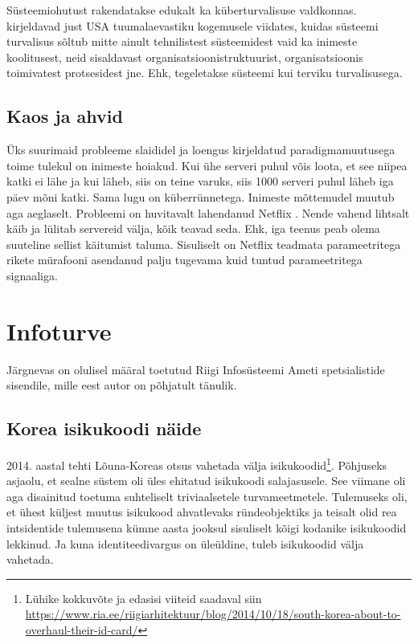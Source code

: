 \documentclass{article}
\begin{document}
Süsteemiohutust rakendatakse edukalt ka küberturvalisuse valdkonnas. \citeauthor{hbrcyber} kirjeldavad \citep{hbrcyber} just USA tuumalaevastiku kogemusele viidates, kuidas süsteemi turvalisus sõltub mitte ainult tehnilistest süsteemidest vaid ka inimeste koolitusest, neid sisaldavast organisatsioonistruktuurist, organisatsioonis toimivatest protsesidest jne. Ehk, tegeletakse süsteemi kui terviku turvalisusega.

\subsection{Kaos ja ahvid}
Üks suurimaid probleeme slaididel ja loengus kirjeldatud paradigmamuutusega toime tulekul on inimeste hoiakud. Kui ühe serveri puhul võis loota, et see niipea katki ei lähe ja kui läheb, siis on teine varuks, siis 1000 serveri puhul läheb iga päev mõni katki. Sama lugu on küberrünnetega. Inimeste mõttemudel muutub aga aeglaselt. Probleemi on huvitavalt lahendanud Netflix \citep{monkey}. Nende vahend lihtsalt käib ja lülitab servereid välja, kõik teavad seda. Ehk, iga teenus peab olema suuteline sellist käitumist taluma. Sisuliselt on Netflix teadmata parameetritega rikete mürafooni asendanud palju tugevama kuid tuntud parameetritega signaaliga.   

\section{Infoturve}
Järgnevas on olulisel määral toetutud Riigi Infosüsteemi Ameti spetsialistide sisendile, mille eest autor on põhjatult tänulik.

\subsection{Korea isikukoodi näide}
2014. aastal tehti Lõuna-Koreas otsus vahetada välja isikukoodid\footnote{Lühike kokkuvõte ja edasisi viiteid saadaval siin \url{https://www.ria.ee/riigiarhitektuur/blog/2014/10/18/south-korea-about-to-overhaul-their-id-card/}}. Põhjuseks asjaolu, et sealne süstem oli üles ehitatud isikukoodi salajasusele. See viimane oli aga disainitud toetuma suhteliselt triviaalsetele turvameetmetele. Tulemuseks oli, et ühest küljest muutus isikukood ahvatlevaks ründeobjektiks ja teisalt olid rea intsidentide tulemusena kümne aasta jooksul sisuliselt kõigi kodanike isikukoodid lekkinud. Ja kuna identiteedivargus on üleüldine, tuleb isikukoodid välja vahetada.
\end{document}
